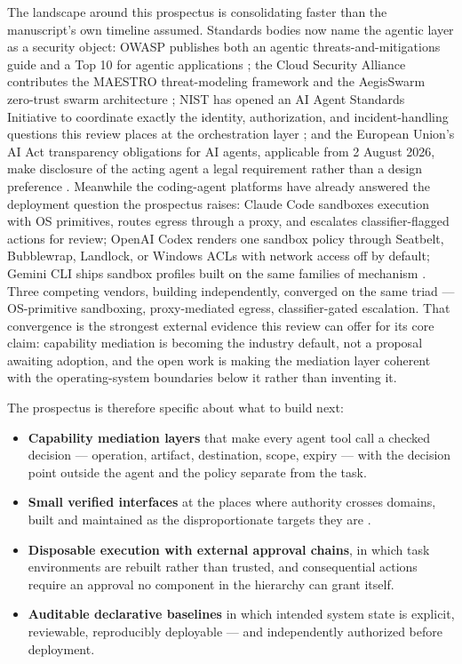 \documentclass[
  english,
  9pt,
]{extarticle}
\providecommand{\tightlist}{%
  \setlength{\itemsep}{0pt}\setlength{\parskip}{0pt}}
\begin{document}
The landscape around this prospectus is consolidating faster than the
manuscript's own timeline assumed. Standards bodies now name the agentic
layer as a security object: OWASP publishes both an agentic
threats-and-mitigations guide and a Top 10 for agentic applications
\citep{owasp_agentic_tm, owasp_agentic_top10}; the Cloud Security
Alliance contributes the MAESTRO threat-modeling framework and the
AegisSwarm zero-trust swarm architecture
\citep{csa_maestro, csa_securing_swarm}; NIST has opened an AI Agent
Standards Initiative to coordinate exactly the identity, authorization,
and incident-handling questions this review places at the orchestration
layer \citep{nist_ai_agent_standards}; and the European Union's AI Act
transparency obligations for AI agents, applicable from 2 August 2026,
make disclosure of the acting agent a legal requirement rather than a
design preference \citep{eu_ai_act_transparency}. Meanwhile the
coding-agent platforms have already answered the deployment question the
prospectus raises: Claude Code sandboxes execution with OS primitives,
routes egress through a proxy, and escalates classifier-flagged actions
for review; OpenAI Codex renders one sandbox policy through Seatbelt,
Bubblewrap, Landlock, or Windows ACLs with network access off by
default; Gemini CLI ships sandbox profiles built on the same families of
mechanism
\citep{anthropic_sandboxing, codex_sandboxing, gemini_cli_sandbox}.
Three competing vendors, building independently, converged on the same
triad --- OS-primitive sandboxing, proxy-mediated egress,
classifier-gated escalation. That convergence is the strongest external
evidence this review can offer for its core claim: capability mediation
is becoming the industry default, not a proposal awaiting adoption, and
the open work is making the mediation layer coherent with the
operating-system boundaries below it rather than inventing it.

The prospectus is therefore specific about what to build next:

\begin{itemize}
\tightlist
\item
  \textbf{Capability mediation layers} that make every agent tool call a
  checked decision --- operation, artifact, destination, scope, expiry
  --- with the decision point outside the agent and the policy separate
  from the task.
\item
  \textbf{Small verified interfaces} at the places where authority
  crosses domains, built and maintained as the disproportionate targets
  they are \citep{klein2009}.
\item
  \textbf{Disposable execution with external approval chains}, in which
  task environments are rebuilt rather than trusted, and consequential
  actions require an approval no component in the hierarchy can grant
  itself.
\item
  \textbf{Auditable declarative baselines} in which intended system
  state is explicit, reviewable, reproducibly deployable --- and
  independently authorized before deployment.
\end{itemize}
\end{document}
